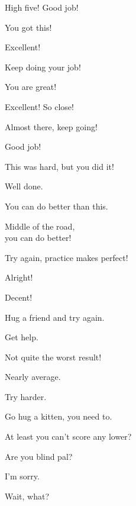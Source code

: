  High five! Good job!

 You got this!

 Excellent!

 Keep doing your job!

 You are great!

 Excellent! So close!

 Almost there, keep going!

 Good job!

 This was hard, but you did it!

 Well done.

 You can do better than this.

 Middle of the road,\\ you can do better!

 Try again, practice makes perfect!

 Alright!

 Decent!

 Hug a friend and try again.

 Get help.

 Not quite the worst result!

 Nearly average.

 Try harder.

 Go hug a kitten, you need to. 

 At least you can't score any lower?

 Are you blind pal?

 I'm sorry.

 Wait, what?

